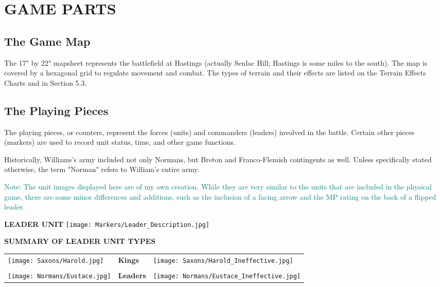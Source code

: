 \section{GAME PARTS}

\subsection{The Game Map}

The 17" by 22" mapsheet represents the battlefield at Hastings (actually Senlac Hill; Hastings is some miles to the south). The map is covered by a hexagonal grid to regulate movement and combat. The types of terrain and their effects are listed on the Terrain Effects Charts and in Section 5.3.

\subsection{The Playing Pieces}

The playing pieces, or counters, represent the forces (units) and commanders (leaders) involved in the battle. Certain other pieces (markers) are used to record unit status, time, and other game functions.

Historically, Williams's army included not only Normans, but Breton and Franco-Flemish contingents as well. Unless specifically stated otherwise, the term "Norman" refers to William's entire army.

\textcolor{teal}{Note: The unit images displayed here are of my own creation. While they are very similar to the units that are included in the physical game, there are some minor differences and additions, such as the inclusion of a facing arrow and the MP rating on the back of a flipped leader.}

\begin{center}
\textbf{LEADER UNIT}
\break
\texttt{[image: Markers/Leader\_Description.jpg]}
\end{center}

\renewcommand\tabularxcolumn[1]{m{#1}}

\par
\begin{center}
  \textbf{SUMMARY OF LEADER UNIT TYPES}
  \break
\end{center}

\begin{tabularx}{0.5\textwidth}{
    >{\raggedright\arraybackslash}X
    >{\centering\arraybackslash}X
    >{\raggedleft\arraybackslash}X}
    \texttt{[image: Saxons/Harold.jpg]} &
    \textbf{Kings} &
    \texttt{[image: Saxons/Harold\_Ineffective.jpg]} \\ \\
    \texttt{[image: Normans/Eustace.jpg]} &
    \textbf{Leaders} &
    \texttt{[image: Normans/Eustace\_Ineffective.jpg]}
\end{tabularx}

